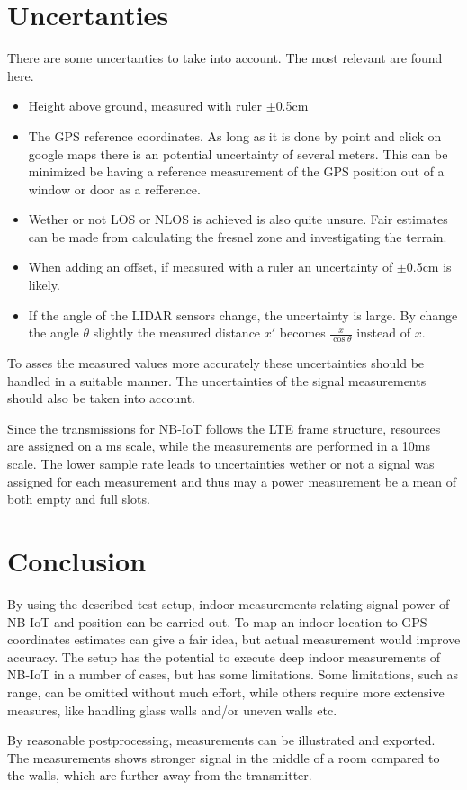 \documentclass[a4paper,twoside, 12pt]{article}
\begin{document}
 
\section{Uncertanties}
There are some uncertanties to take into account. The most relevant are found here.
\begin{itemize}
	\item Height above ground, measured with ruler $\pm$0.5cm
	\item The GPS reference coordinates. As long as it is done by point and click on google maps there is an potential uncertainty of several meters. This can be minimized be having a reference measurement of the GPS position out of a window or door as a refference. 
	\item Wether or not LOS or NLOS is achieved is also quite unsure. Fair estimates can be made from calculating the fresnel zone and investigating the terrain.
	\item When adding an offset, if measured with a ruler an uncertainty of $\pm$0.5cm is likely.
	\item If the angle of the LIDAR sensors change, the uncertainty is large. By change the angle $\theta$ slightly the measured distance $x'$ becomes $\frac{x}{\cos \theta}$ instead of $x$.
\end{itemize}
To asses the measured values more accurately these uncertainties should be handled in a suitable manner. The uncertainties of the signal measurements should also be taken into account.

Since the transmissions for NB-IoT follows the LTE frame structure, resources are assigned on a ms scale, while the measurements are performed in a 10ms scale. The lower sample rate leads to uncertainties wether or not a signal was assigned for each measurement and thus may a power measurement be a mean of both empty and full slots.

\section{Conclusion}
By using the described test setup, indoor measurements relating signal power of NB-IoT and position can be carried out. To map an indoor location to GPS coordinates estimates can give a fair idea, but actual measurement would improve accuracy. The setup has the potential to execute deep indoor measurements of NB-IoT in a number of cases, but has some limitations. Some limitations, such as range, can be omitted without much effort, while others require more extensive measures, like handling glass walls and/or uneven walls etc.

By reasonable postprocessing, measurements can be illustrated and exported. The measurements shows stronger signal in the middle of a room compared to the walls, which are further away from the transmitter.



\clearpage
\newpage


\end{document}
